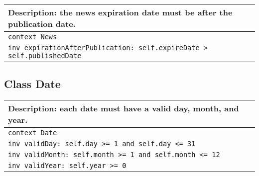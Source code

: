 \begin{table}[ht]
  \centering
  \begin{tabular}{p{}}
    \hline
    \textbf{Description:} the news expiration date must be after the publication date.\\
    \hline
    \texttt{context News}\\
    \texttt{inv expirationAfterPublication: self.expireDate > self.publishedDate}\\
    \hline
  \end{tabular}
\end{table}

\subsection{Class Date}

\begin{table}[ht]
  \centering
  \begin{tabular}{p{}}
    \hline
    \textbf{Description:} each date must have a valid day, month, and year.\\
    \hline
    \texttt{context Date}\\
    \texttt{inv validDay: self.day >= 1 and self.day <= 31}\\
    \texttt{inv validMonth: self.month >= 1 and self.month <= 12}\\
    \texttt{inv validYear: self.year >= 0}\\
    \hline
  \end{tabular}
\end{table}
